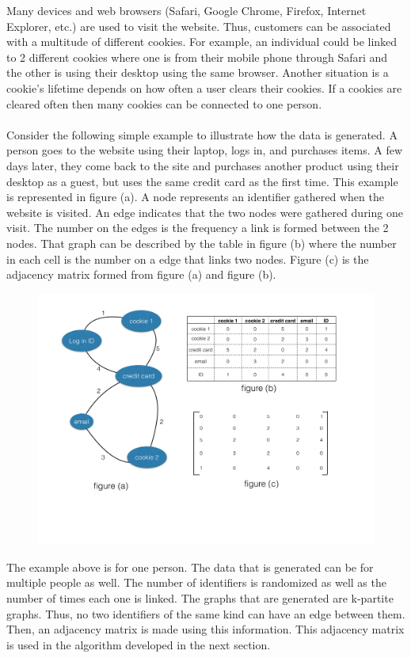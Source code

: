 \documentclass{article}
\theoremstyle{plain}			%
\theoremstyle{definition}		%
\theoremstyle{remark}
\numberwithin{equation}{section}
\numberwithin{figure}{section}
\numberwithin{table}{section}
\begin{document}
Many devices and web browsers (Safari, Google Chrome, Firefox, Internet Explorer, etc.) are used to visit the website. Thus, customers can be associated with a multitude of different cookies. For example, an individual could be linked to 2 different cookies where one is from their mobile phone through Safari and the other is using their desktop using the same browser. Another situation is a cookie's lifetime depends on how often a user clears their cookies. If a cookies are cleared often then many cookies can be connected to one person. \\ 
\\
Consider the following simple example to illustrate how the data is generated. A person goes to the website using their laptop, logs in, and purchases items. A few days later, they come back to the site and purchases another product using their desktop as a guest, but uses the same credit card as the first time. This example is represented in figure (a).  A node represents an identifier gathered when the website is visited. An edge indicates that the two nodes were gathered during one visit. The number on the edges is the frequency a link is formed between the 2 nodes. That graph can be described by the table in figure (b) where the number in each cell is the number on a edge that links two nodes. Figure (c) is the adjacency matrix formed from figure (a) and figure (b).  
\begin{figure}[H]
\centering 
\includegraphics[scale=.3]{graph}
\end{figure}
The example above is for one person. The data that is generated can be for multiple people as well. The number of identifiers is randomized as well as the number of times each one is linked. The graphs that are generated are k-partite graphs. Thus, no two identifiers of the same kind can have an edge between them. Then, an adjacency matrix is made using this information. This adjacency matrix is used in the algorithm developed in the next section.
\end{document}

